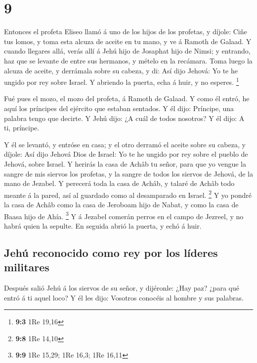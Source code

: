 \hypertarget{section-8}{%
\section{9}\label{section-8}}

 Entonces el profeta Eliseo llamó á uno de los hijos de
los profetas, y díjole: Ciñe tus lomos, y toma esta alcuza de aceite en
tu mano, y ve á Ramoth de Galaad.  Y cuando llegares allá,
verás allí á Jehú hijo de Josaphat hijo de Nimsi; y entrando, haz que se
levante de entre sus hermanos, y mételo en la recámara. 
Toma luego la alcuza de aceite, y derrámala sobre su cabeza, y di: Así
dijo Jehová: Yo te he ungido por rey sobre Israel. Y abriendo la puerta,
echa á huir, y no esperes. \footnote{\textbf{9:3} 1Re 19,16}

 Fué pues el mozo, el mozo del profeta, á Ramoth de
Galaad.  Y como él entró, he aquí los príncipes del
ejército que estaban sentados. Y él dijo: Príncipe, una palabra tengo
que decirte. Y Jehú dijo: ¿A cuál de todos nosotros? Y él dijo: A ti,
príncipe.

 Y él se levantó, y entróse en casa; y el otro derramó el
aceite sobre su cabeza, y díjole: Así dijo Jehová Dios de Israel: Yo te
he ungido por rey sobre el pueblo de Jehová, sobre Israel.
 Y herirás la casa de Achâb tu señor, para que yo vengue
la sangre de mis siervos los profetas, y la sangre de todos los siervos
de Jehová, de la mano de Jezabel.  Y perecerá toda la casa
de Achâb, y talaré de Achâb todo meante á la pared, así al guardado como
al desamparado en Israel. \footnote{\textbf{9:8} 1Re 14,10}
 Y yo pondré la casa de Achâb como la casa de Jeroboam
hijo de Nabat, y como la casa de Baasa hijo de Ahía. \footnote{\textbf{9:9}
  1Re 15,29; 1Re 16,3; 1Re 16,11}  Y á Jezabel comerán
perros en el campo de Jezreel, y no habrá quien la sepulte. En seguida
abrió la puerta, y echó á huir.

\hypertarget{jehuxfa-reconocido-como-rey-por-los-luxedderes-militares}{%
\subsection{Jehú reconocido como rey por los líderes
militares}\label{jehuxfa-reconocido-como-rey-por-los-luxedderes-militares}}

 Después salió Jehú á los siervos de su señor, y
dijéronle: ¿Hay paz? ¿para qué entró á ti aquel loco? Y él les dijo:
Vosotros conocéis al hombre y sus palabras.

